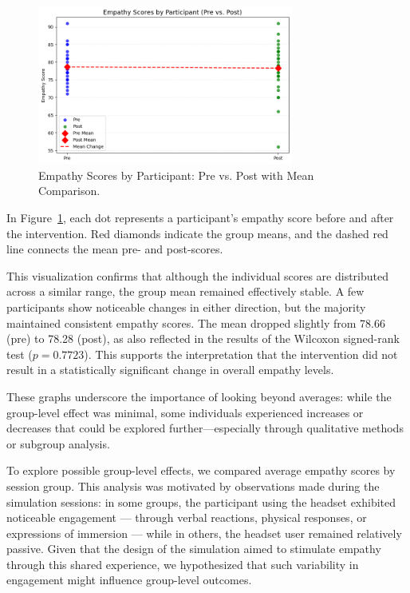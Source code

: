 \begin{figure}[htbp]
    \centering
    \includegraphics[width=0.75\textwidth]{../../Figures/emph-comparison-means.png}
    \caption{Empathy Scores by Participant: Pre vs. Post with Mean Comparison.}
    \label{fig:empathy_means_line}
\end{figure}

In Figure~\ref{fig:empathy_means_line}, each dot represents a participant’s empathy score before and after the intervention. Red diamonds indicate the group means, and the dashed red line connects the mean pre- and post-scores.

This visualization confirms that although the individual scores are distributed across a similar range, the group mean remained effectively stable. A few participants show noticeable changes in either direction, but the majority maintained consistent empathy scores. The mean dropped slightly from 78.66 (pre) to 78.28 (post), as also reflected in the results of the Wilcoxon signed-rank test ($p = 0.7723$). This supports the interpretation that the intervention did not result in a statistically significant change in overall empathy levels.

These graphs underscore the importance of looking beyond averages: while the group-level effect was minimal, some individuals experienced increases or decreases that could be explored further—especially through qualitative methods or subgroup analysis.

To explore possible group-level effects, we compared average empathy scores by session group. This analysis was motivated by observations made during the simulation sessions: in some groups, the participant using the headset exhibited noticeable engagement — through verbal reactions, physical responses, or expressions of immersion — while in others, the headset user remained relatively passive. Given that the design of the simulation aimed to stimulate empathy through this shared experience, we hypothesized that such variability in engagement might influence group-level outcomes.


